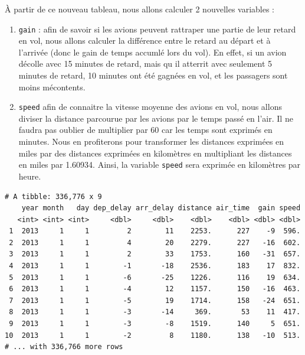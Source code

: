 \documentclass[
  a4paper,
]{article}
\newenvironment{Shaded}{\begin{snugshade}}{\end{snugshade}}
\newcommand{\DataTypeTok}[1]{\textcolor[rgb]{0.00,0.34,0.68}{#1}}
\newcommand{\DecValTok}[1]{\textcolor[rgb]{0.69,0.50,0.00}{#1}}
\newcommand{\FloatTok}[1]{\textcolor[rgb]{0.69,0.50,0.00}{#1}}
\newcommand{\KeywordTok}[1]{\textcolor[rgb]{0.12,0.11,0.11}{\textbf{#1}}}
\newcommand{\NormalTok}[1]{\textcolor[rgb]{0.12,0.11,0.11}{#1}}
\newcommand{\OperatorTok}[1]{\textcolor[rgb]{0.12,0.11,0.11}{#1}}
\newcommand{\StringTok}[1]{\textcolor[rgb]{0.75,0.01,0.01}{#1}}
\providecommand{\tightlist}{%
  \setlength{\itemsep}{0pt}\setlength{\parskip}{0pt}}
\begin{document}
À partir de ce nouveau tableau, nous allons calculer 2 nouvelles variables :

\begin{enumerate}
\def\labelenumi{\arabic{enumi}.}
\tightlist
\item
  \texttt{gain} : afin de savoir si les avions peuvent rattraper une partie de leur retard en vol, nous allons calculer la différence entre le retard au départ et à l'arrivée (donc le gain de temps accumlé lors du vol). En effet, si un avion décolle avec 15 minutes de retard, mais qu
  il atterrit avec seulement 5 minutes de retard, 10 minutes ont été gagnées en vol, et les passagers sont moins mécontents.
\item
  \texttt{speed} afin de connaitre la vitesse moyenne des avions en vol, nous allons diviser la distance parcourue par les avions par le temps passé en l'air. Il ne faudra pas oublier de multiplier par 60 car les temps sont exprimés en minutes. Nous en profiterons pour transformer les distances exprimées en miles par des distances exprimées en kilomètres en multipliant les distances en miles par 1.60934. Ainsi, la variable \texttt{speed} sera exprimée en kilomètres par heure.
\end{enumerate}

\begin{Shaded}
\end{Shaded}

\begin{verbatim}
# A tibble: 336,776 x 9
    year month   day dep_delay arr_delay distance air_time  gain speed
   <int> <int> <int>     <dbl>     <dbl>    <dbl>    <dbl> <dbl> <dbl>
 1  2013     1     1         2        11    2253.      227    -9  596.
 2  2013     1     1         4        20    2279.      227   -16  602.
 3  2013     1     1         2        33    1753.      160   -31  657.
 4  2013     1     1        -1       -18    2536.      183    17  832.
 5  2013     1     1        -6       -25    1226.      116    19  634.
 6  2013     1     1        -4        12    1157.      150   -16  463.
 7  2013     1     1        -5        19    1714.      158   -24  651.
 8  2013     1     1        -3       -14     369.       53    11  417.
 9  2013     1     1        -3        -8    1519.      140     5  651.
10  2013     1     1        -2         8    1180.      138   -10  513.
# ... with 336,766 more rows
\end{verbatim}
\end{document}
